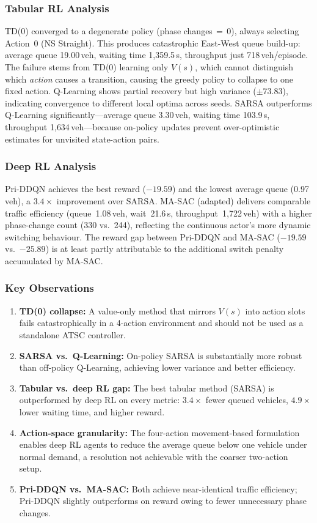 \documentclass[conference]{IEEEtran}
\begin{document}
\subsubsection{Tabular RL Analysis}
TD(0) converged to a degenerate policy (phase changes\,$=$\,0),
always selecting Action~0 (NS Straight). This produces catastrophic
East-West queue build-up: average queue 19.00\,veh, waiting time
1{,}359.5\,s, throughput just 718\,veh/episode. The failure stems
from TD(0) learning only $V(s)$, which cannot distinguish which
\emph{action} causes a transition, causing the greedy policy to
collapse to one fixed action. Q-Learning shows partial recovery but
high variance ($\pm73.83$), indicating convergence to different
local optima across seeds. SARSA outperforms Q-Learning
significantly---average queue 3.30\,veh, waiting time 103.9\,s,
throughput 1{,}634\,veh---because on-policy updates prevent
over-optimistic estimates for unvisited state-action pairs.

\subsubsection{Deep RL Analysis}
Pri-DDQN achieves the best reward ($-19.59$) and the lowest average
queue (0.97\,veh), a $3.4\times$ improvement over SARSA.
MA-SAC (adapted) delivers comparable traffic efficiency
(queue~1.08\,veh, wait~21.6\,s, throughput~1{,}722\,veh) with a
higher phase-change count (330 vs.\ 244), reflecting the continuous
actor's more dynamic switching behaviour. The reward gap between
Pri-DDQN and MA-SAC ($-19.59$ vs.\ $-25.89$) is at least partly
attributable to the additional switch penalty accumulated by MA-SAC.

\subsubsection{Key Observations}
\begin{enumerate}
  \item \textbf{TD(0) collapse:} A value-only method that mirrors
    $V(s)$ into action slots fails catastrophically in a 4-action
    environment and should not be used as a standalone ATSC
    controller.
  \item \textbf{SARSA vs.\ Q-Learning:} On-policy SARSA is
    substantially more robust than off-policy Q-Learning,
    achieving lower variance and better efficiency.
  \item \textbf{Tabular vs.\ deep RL gap:} The best tabular method
    (SARSA) is outperformed by deep RL on every metric:
    $3.4\times$ fewer queued vehicles, $4.9\times$ lower waiting
    time, and higher reward.
  \item \textbf{Action-space granularity:} The four-action
    movement-based formulation enables deep RL agents to reduce the
    average queue below one vehicle under normal demand, a
    resolution not achievable with the coarser two-action setup.
  \item \textbf{Pri-DDQN vs.\ MA-SAC:} Both achieve near-identical
    traffic efficiency; Pri-DDQN slightly outperforms on reward
    owing to fewer unnecessary phase changes.
\end{enumerate}
\end{document}
